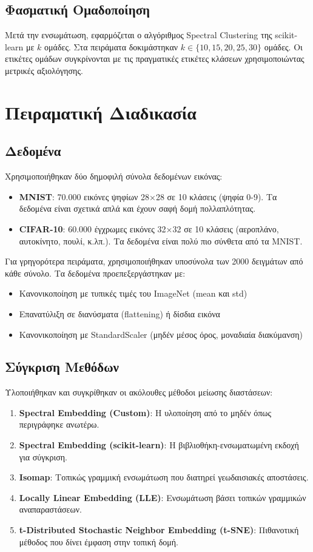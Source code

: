 \documentclass[a4paper,11pt]{article}
\newcommand{\lt}[1]{\foreignlanguage{english}{#1}}
\begin{document}
\subsection{Φασματική Ομαδοποίηση}
Μετά την ενσωμάτωση, εφαρμόζεται ο αλγόριθμος \lt{Spectral Clustering} της \lt{scikit-learn} με $k$ ομάδες. Στα πειράματα δοκιμάστηκαν $k \in \{10, 15, 20, 25, 30\}$ ομάδες. Οι ετικέτες ομάδων συγκρίνονται με τις πραγματικές ετικέτες κλάσεων χρησιμοποιώντας μετρικές αξιολόγησης.

\section{Πειραματική Διαδικασία}
\subsection{Δεδομένα}
Χρησιμοποιήθηκαν δύο δημοφιλή σύνολα δεδομένων εικόνας:
\begin{itemize}
  \item \textbf{\lt{MNIST}}: 70.000 εικόνες ψηφίων 28×28 σε 10 κλάσεις (ψηφία 0-9). Τα δεδομένα είναι σχετικά απλά και έχουν σαφή δομή πολλαπλότητας.
  \item \textbf{\lt{CIFAR-10}}: 60.000 έγχρωμες εικόνες 32×32 σε 10 κλάσεις (αεροπλάνο, αυτοκίνητο, πουλί, κ.λπ.). Τα δεδομένα είναι πολύ πιο σύνθετα από τα \lt{MNIST}.
\end{itemize}
Για γρηγορότερα πειράματα, χρησιμοποιήθηκαν υποσύνολα των 2000 δειγμάτων από κάθε σύνολο. Τα δεδομένα προεπεξεργάστηκαν με:
\begin{itemize}
  \item Κανονικοποίηση με τυπικές τιμές του \lt{ImageNet} (\lt{mean} και \lt{std})
  \item Επανατύλιξη σε διανύσματα (flattening) ή δίσδια εικόνα
  \item Κανονικοποίηση με \lt{StandardScaler} (μηδέν μέσος όρος, μοναδιαία διακύμανση)
\end{itemize}

\subsection{Σύγκριση Μεθόδων}
Υλοποιήθηκαν και συγκρίθηκαν οι ακόλουθες μέθοδοι μείωσης διαστάσεων:
\begin{enumerate}
  \item \textbf{\lt{Spectral Embedding (Custom)}}: Η υλοποίηση από το μηδέν όπως περιγράφηκε ανωτέρω.
  \item \textbf{\lt{Spectral Embedding (scikit-learn)}}: Η βιβλιοθήκη-ενσωματωμένη εκδοχή για σύγκριση.
  \item \textbf{\lt{Isomap}}: Τοπικώς γραμμική ενσωμάτωση που διατηρεί γεωδαισιακές αποστάσεις.
  \item \textbf{\lt{Locally Linear Embedding (LLE)}}: Ενσωμάτωση βάσει τοπικών γραμμικών αναπαραστάσεων.
  \item \textbf{\lt{t-Distributed Stochastic Neighbor Embedding (t-SNE)}}: Πιθανοτική μέθοδος που δίνει έμφαση στην τοπική δομή.
\end{enumerate}
\end{document}
